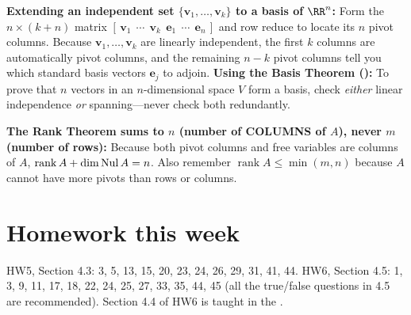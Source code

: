 \documentclass[10pt]{scrartcl}
\newcommand{\vv}[1]{\mathbf{#1}}
\begin{document}
\begin{shortcuts}
  \ii \textbf{Extending an independent set $\{\vv v_1,\dots,\vv v_k\}$ to a basis of $\RR^n$:} Form the $n\times(k+n)$ matrix $[\,\vv v_1\ \ \cdots\ \ \vv v_k\ \ \vv e_1\ \ \cdots\ \ \vv e_n\,]$ and row reduce to locate its $n$ pivot columns. Because $\vv v_1,\dots,\vv v_k$ are linearly independent, the first $k$ columns are automatically pivot columns, and the remaining $n-k$ pivot columns tell you which standard basis vectors $\vv e_j$ to adjoin.
  \ii \textbf{Using the Basis Theorem ():} To prove that $n$ vectors in an $n$-dimensional space $V$ form a basis, check \emph{either} linear independence \emph{or} spanning---never check both redundantly.
\end{shortcuts}

\begin{trapbox}
  \ii \textbf{The Rank Theorem sums to $n$ (number of COLUMNS of $A$), never $m$ (number of rows):} Because both pivot columns and free variables are columns of $A$, $\operatorname{rank}A+\dim\operatorname{Nul} A=n$. Also remember $\operatorname{rank}A\le\min(m,n)$ because $A$ cannot have more pivots than rows or columns.
\end{trapbox}

\section{Homework this week}
HW5, Section 4.3: 3, 5, 13, 15, 20, 23, 24, 26, 29, 31, 41, 44. HW6, Section 4.5: 1, 3, 9, 11, 17, 18, 22, 24, 25, 27, 33, 35, 44, 45 (all the true/false questions in 4.5 are recommended). Section 4.4 of HW6 is taught in the .
\end{document}
